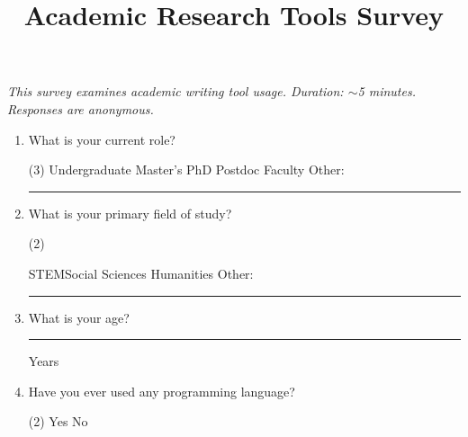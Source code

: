 \documentclass[a4paper,12pt]{article}
\title{\vspace{-1.5cm}\textbf{Academic Research Tools Survey}}
\author{}
\date{}
\begin{document}
\maketitle
\vspace{-1.2cm}

\noindent\textit{This survey examines academic writing tool usage. Duration: $\sim$5 minutes. Responses are anonymous.}

\vspace{0.8cm}


\begin{enumerate}

\item What is your current role?
\begin{tasks}(3)
\task Undergraduate \task Master’s \task PhD
\task Postdoc \task Faculty \task Other: \rule{2.5cm}{0.4pt}
\end{tasks}

\item What is your primary field of study?
\begin{tasks}(2)

\task STEM\footnotemark \task Social Sciences
\task Humanities \task Other: \rule{2.5cm}{0.4pt}
\end{tasks}
\vspace{-5pt}


\item What is your age? \rule{3cm}{0.4pt} Years
\item Have you ever used any programming language?
\begin{tasks}(2)
\task Yes \task No
\end{tasks}
\end{enumerate}

\end{document}

